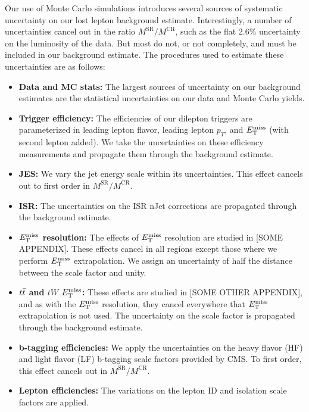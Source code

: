Our use of Monte Carlo simulations introduces several sources of
systematic uncertainty on our lost lepton background
estimate. Interestingly, a number of uncertainties cancel out in the
ratio $M^\text{SR} / M^\text{CR}$, such as the flat 2.6\% uncertainty
on the luminosity of the data. But most do not, or not completely, and
must be included in our background estimate. The procedures used to
estimate these uncertainties are as follows:

\begin{itemize}
\item \textbf{Data and MC stats:} The largest sources of uncertainty
  on our background estimates are the statistical uncertainties on our
  data and Monte Carlo yields.
\item \textbf{Trigger efficiency:} The efficiencies of our dilepton
  triggers are parameterized in leading lepton flavor, leading lepton
  $p_T$, and $E_\text{T}^\text{miss}$ (with second lepton added). We take the
  uncertainties on these efficiency measurements and propagate them
  through the background estimate.
\item \textbf{JES:} We vary the jet energy scale within its
  uncertainties. This effect cancels out to first order in
  $M^\text{SR} / M^\text{CR}$.
\item \textbf{ISR:} The uncertainties on the ISR nJet corrections are
  propagated through the background estimate.
\item \textbf{$E_\text{T}^\text{miss}$ resolution:} The effects of $E_\text{T}^\text{miss}$ resolution are %
  studied in [SOME APPENDIX]. These effects cancel in all regions
  except those where we perform $E_\text{T}^\text{miss}$ extrapolation. We assign an
  uncertainty of half the distance between the scale factor and
  unity.
\item \textbf{$t\bar{t}$ and $tW$ $E_\text{T}^\text{miss}$:} These effects are studied in %
  [SOME OTHER APPENDIX], and as with the $E_\text{T}^\text{miss}$ resolution, they
  cancel everywhere that $E_\text{T}^\text{miss}$ extrapolation is not used. The
  uncertainty on the scale factor is propagated through the background
  estimate.
\item \textbf{b-tagging efficiencies:} We apply the uncertainties on the heavy
  flavor (HF) and light flavor (LF) b-tagging scale factors provided
  by CMS. To first order, this effect cancels out in $M^\text{SR} /
  M^\text{CR}$.
\item \textbf{Lepton efficiencies:} The variations on the lepton ID
  and isolation scale factors are applied.

\end{itemize}
